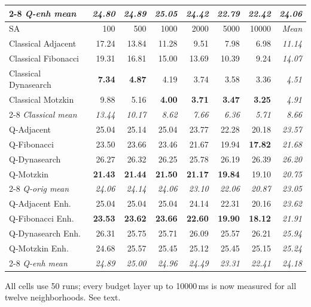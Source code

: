 \documentclass[preprint,12pt,authoryear]{elsarticle}
\begin{document}
\begin{table}[!tp]
\begin{tabular}{@{}lrrrrrr@{\quad}r@{}}
\cmidrule(l){2-8}
\emph{Q-enh mean}    & \emph{24.80} & \emph{24.89} & \emph{25.05} & \emph{24.42} & \emph{22.79} & \emph{22.42} & \emph{24.06} \\
\midrule
SA & 100 & 500 & 1000 & 2000 & 5000 & 10000 & \emph{Mean} \\
\midrule
Classical Adjacent   & 17.24 & 13.84 & 11.28 &  9.51 &  7.98 &  6.98 & \emph{11.14} \\
Classical Fibonacci  & 19.31 & 16.81 & 15.00 & 13.69 & 10.39 &  9.24 & \emph{14.07} \\
Classical Dynasearch &  \textbf{7.34} &  \textbf{4.87} &  4.19 &  3.74 &  3.58 &  3.36 & \emph{4.51} \\
Classical Motzkin    &  9.88 &  5.16 &  \textbf{4.00} &  \textbf{3.71} &  \textbf{3.47} &  \textbf{3.25} & \emph{4.91} \\
\cmidrule(l){2-8}
\emph{Classical mean} & \emph{13.44} & \emph{10.17} & \emph{8.62} & \emph{7.66} & \emph{6.36} & \emph{5.71} & \emph{8.66} \\
\midrule
Q-Adjacent           & 25.04 & 25.14 & 25.04 & 23.77 & 22.28 & 20.18 & \emph{23.57} \\
Q-Fibonacci          & 23.50 & 23.66 & 23.46 & 21.67 & 19.94 & \textbf{17.82} & \emph{21.68} \\
Q-Dynasearch         & 26.27 & 26.32 & 26.25 & 25.78 & 26.19 & 26.39 & \emph{26.20} \\
Q-Motzkin            & \textbf{21.43} & \textbf{21.44} & \textbf{21.50} & \textbf{21.17} & \textbf{19.84} & 19.10 & \emph{20.75} \\
\cmidrule(l){2-8}
\emph{Q-orig mean}   & \emph{24.06} & \emph{24.14} & \emph{24.06} & \emph{23.10} & \emph{22.06} & \emph{20.87} & \emph{23.05} \\
\midrule
Q-Adjacent Enh.      & 25.04 & 25.04 & 25.04 & 24.14 & 22.31 & 20.16 & \emph{23.62} \\
Q-Fibonacci Enh.     & \textbf{23.53} & \textbf{23.62} & \textbf{23.66} & \textbf{22.60} & \textbf{19.90} & \textbf{18.12} & \emph{21.91} \\
Q-Dynasearch Enh.    & 26.31 & 25.75 & 25.71 & 26.09 & 25.57 & 26.21 & \emph{25.94} \\
Q-Motzkin Enh.       & 24.68 & 25.57 & 25.45 & 25.12 & 25.45 & 25.15 & \emph{25.24} \\
\cmidrule(l){2-8}
\emph{Q-enh mean}    & \emph{24.89} & \emph{25.00} & \emph{24.96} & \emph{24.49} & \emph{23.31} & \emph{22.41} & \emph{24.18} \\
\bottomrule
\end{tabular}

\smallskip
\begin{minipage}{0.94\linewidth}\footnotesize
All cells use 50 runs; every budget layer up to 10000\,ms is now
measured for all twelve neighborhoods. See text.
\end{minipage}
\end{table}
\end{document}
